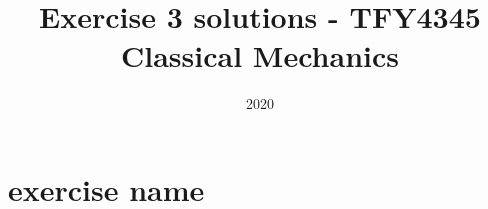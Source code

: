 \documentclass{article}
\title{Exercise 3 solutions - TFY4345 Classical Mechanics}
\date{2020}
\begin{document}
    \maketitle
    \section{exercise name}
\end{document}
